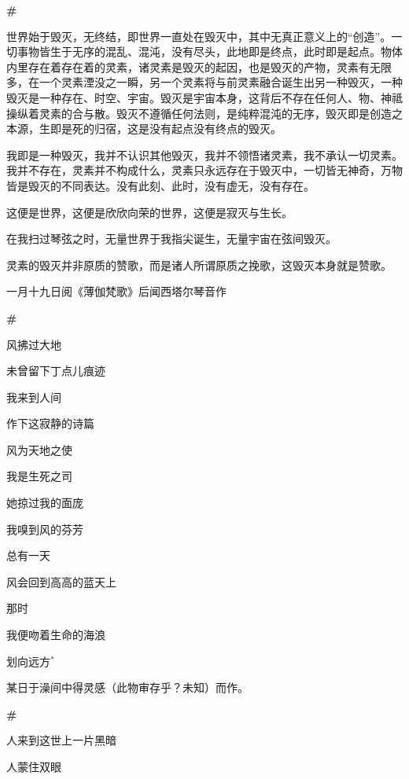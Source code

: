 \documentclass{ctexbook}
\begin{document}
\newpage
\textbf{\#}


\mbox


    世界始于毁灭，无终结，即世界一直处在毁灭中，其中无真正意义上的“创造”。一切事物皆生于无序的混乱、混沌，没有尽头，此地即是终点，此时即是起点。物体内里存在着存在着的灵素，诸灵素是毁灭的起因，也是毁灭的产物，灵素有无限多，在一个灵素湮没之一瞬，另一个灵素将与前灵素融合诞生出另一种毁灭，一种毁灭是一种存在、时空、宇宙。毁灭是宇宙本身，这背后不存在任何人、物、神祗操纵着灵素的合与散。毁灭不遵循任何法则，是纯粹混沌的无序，毁灭即是创造之本源，生即是死的归宿，这是没有起点没有终点的毁灭。

    我即是一种毁灭，我并不认识其他毁灭，我并不领悟诸灵素，我不承认一切灵素。我并不存在，灵素并不构成什么，灵素只永远存在于毁灭中，一切皆无神奇，万物皆是毁灭的不同表达。没有此刻、此时，没有虚无，没有存在。

    这便是世界，这便是欣欣向荣的世界，这便是寂灭与生长。

    在我扫过琴弦之时，无量世界于我指尖诞生，无量宇宙在弦间毁灭。

    灵素的毁灭并非原质的赞歌，而是诸人所谓原质之挽歌，这毁灭本身就是赞歌。


\mbox


    \hfill{一月十九日阅《薄伽梵歌》后闻西塔尔琴音作}

\newpage
\textbf{\#}


\mbox


    风拂过大地

    未曾留下丁点儿痕迹

    我来到人间

    作下这寂静的诗篇

    风为天地之使

    我是生死之司

    她掠过我的面庞

    我嗅到风的芬芳

    总有一天

    风会回到高高的蓝天上

    那时

    我便吻着生命的海浪

    划向远方\(^*\)


\mbox


    {\normalsize *某日于澡间中得灵感（此物审存乎？未知）而作。}

\newpage
\textbf{\#}


\mbox


    人来到这世上一片黑暗

    人蒙住双眼
\end{document}
